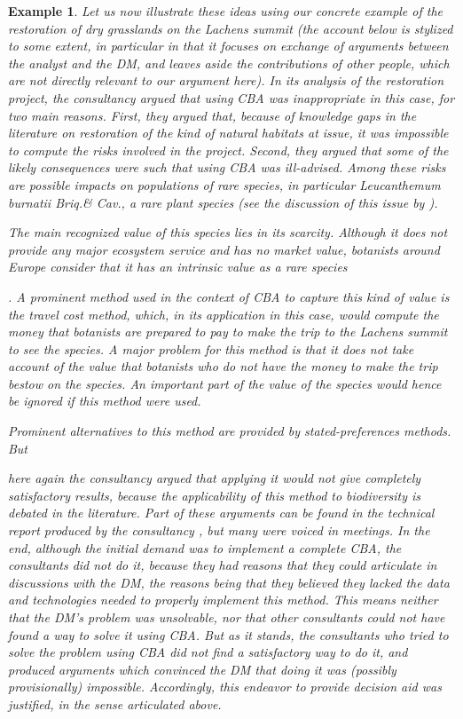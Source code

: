 \documentclass[preprint, french, english, 11pt, authoryear]{elsarticle}%
\newtheorem{example}{Example}
\begin{document}
\begin{example}
Let us now illustrate these ideas using our concrete example of the restoration of dry grasslands on the Lachens summit 
(the account below is stylized to some extent, in particular in that it focuses on exchange of arguments between the analyst and the \ac{DM}, and leaves aside the contributions of other people, which are not directly relevant to our argument here). 
In its analysis of the restoration project, the consultancy argued that using \ac{CBA} was inappropriate in this case, for two main reasons. 
First, they argued that, because of knowledge gaps in the literature on restoration of the kind of natural habitats at issue, it was impossible to compute the risks involved in the project. 
Second, they argued that some of the likely consequences were such that using \ac{CBA} was ill-advised.
 Among these risks are possible impacts on populations of rare species, in particular \emph{Leucanthemum burnatii} Briq.\@ \& Cav.\@, a rare plant species (see the discussion of this issue by \citet{meinard_ethical_2016}).
\begin{changebar}The main recognized value of this species lies in its scarcity. Although it does not provide any major ecosystem service and has no market value, botanists around Europe consider that it has an intrinsic value as a rare species\end{changebar}.
A prominent method used in the context of \ac{CBA} to capture this kind of value is the travel cost method, which, in its application in this case, would compute the money that botanists are prepared to pay to make the trip to the Lachens summit to see the species.
A major problem for this method is that it does not take account of the value that botanists who do not have the money to make the trip bestow on the species. An important part of the value of the species would hence be ignored if this method were used.
\begin{changebar}Prominent alternatives to this method are provided by stated-preferences methods. But\end{changebar} here again the consultancy argued that applying it would not give completely satisfactory results, because the applicability of this method to biodiversity is debated in the literature.
Part of these arguments can be found in the technical report produced by the consultancy \citep{meinard_etude_2015}, but many were voiced in meetings.
In the end, although the initial demand was to implement a complete \ac{CBA}, the consultants did not do it, because they had reasons that they could articulate in discussions with the \ac{DM}, the reasons being that they believed they lacked the data and technologies needed to properly implement this method. 
This means neither that the \ac{DM}’s problem was unsolvable, nor that other consultants could not have found a way to solve it using \ac{CBA}.
But as it stands, the consultants who tried to solve the problem using \ac{CBA} did not find a satisfactory way to do it, and produced arguments which convinced the \ac{DM} that doing it was (possibly provisionally) impossible.
Accordingly, this endeavor to provide decision aid was justified, in the sense articulated above.
\end{example}
\end{document}
